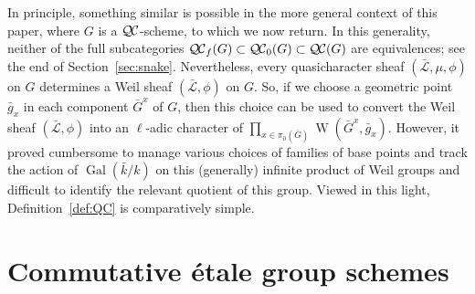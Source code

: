 \documentclass[11pt]{amsart}
\theoremstyle{plain}
\theoremstyle{definition}
\theoremstyle{remark}
\newcommand{\bFq}{\bar{k}}
\newcommand{\Fq}{k}
\DeclareMathOperator{\Gal}{Gal}
\DeclareMathOperator{\W}{W}
\newcommand{\gqcs}[1]{{\mathcal{\bar #1}}}
\newcommand{\QC}{{\mathcal{Q\hskip-0.8pt C}}}
\newcommand{\QCb}{{\QC_0}}
\newcommand{\QCf}{{\QC_f}}
\newcommand{\bG}{\bar{G}}
\begin{document}
In principle, something similar is possible in the more general 
context of this paper, where $G$ is a $\QC$-scheme, to which we now return. 
In this generality, neither of the full subcategories $\QCf(G) \subset \QCb(G) \subset \QC(G)$ are equivalences;
see the end of Section~\ref{sec:snake}.
Nevertheless, every quasicharacter sheaf $(\gqcs{L},\mu,\phi)$ on $G$ 
determines a Weil sheaf $(\gqcs{L},\phi)$ on $G$. 
So, if we choose a geometric point ${\bar g}_x$ in each component $\bG^x$ of $G$, then this choice can be used to convert 
the Weil sheaf $(\gqcs{L},\phi)$ into an $\ell$-adic character of $\prod_{x\in \pi_0(\bG)}\W(\bG^x, {\bar g}_x)$. 
However, it proved cumbersome to manage various 
choices of families of base points and track the action 
of $\Gal(\bFq/\Fq)$ on this (generally) infinite product of 
Weil groups and difficult to identify the relevant quotient of this group.
Viewed in this light, Definition~\ref{def:QC} is comparatively simple.

\section{Commutative \'etale group schemes} \label{sec:etale}

%
\end{document}

